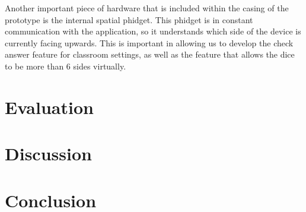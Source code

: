 \documentclass{sigchi}
\begin{document}
  Another important piece of hardware that is included within the casing of the prototype is the internal spatial phidget. This phidget is in constant communication with the application, so it understands which side of the device is currently facing upwards. This is important in allowing us to develop the check answer feature for classroom settings, as well as the feature that allows the dice to be more than 6 sides virtually.


\section{Evaluation}



\section{Discussion}



\section{Conclusion}






\end{document}
